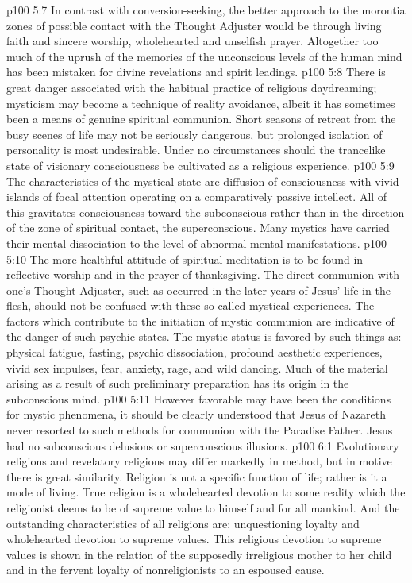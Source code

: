 \vs p100 5:7 \pc In contrast with conversion\hyp{}seeking, the better approach to the morontia zones of possible contact with the Thought Adjuster would be through living faith and sincere worship, wholehearted and unselfish prayer. Altogether too much of the uprush of the memories of the unconscious levels of the human mind has been mistaken for divine revelations and spirit leadings.
\vs p100 5:8 There is great danger associated with the habitual practice of religious daydreaming; mysticism may become a technique of reality avoidance, albeit it has sometimes been a means of genuine spiritual communion. Short seasons of retreat from the busy scenes of life may not be seriously dangerous, but prolonged isolation of personality is most undesirable. Under no circumstances should the trancelike state of visionary consciousness be cultivated as a religious experience.
\vs p100 5:9 The characteristics of the mystical state are diffusion of consciousness with vivid islands of focal attention operating on a comparatively passive intellect. All of this gravitates consciousness toward the subconscious rather than in the direction of the zone of spiritual contact, the superconscious. Many mystics have carried their mental dissociation to the level of abnormal mental manifestations.
\vs p100 5:10 The more healthful attitude of spiritual meditation is to be found in reflective worship and in the prayer of thanksgiving. The direct communion with one’s Thought Adjuster, such as occurred in the later years of Jesus’ life in the flesh, should not be confused with these so\hyp{}called mystical experiences. The factors which contribute to the initiation of mystic communion are indicative of the danger of such psychic states. The mystic status is favored by such things as: physical fatigue, fasting, psychic dissociation, profound aesthetic experiences, vivid sex impulses, fear, anxiety, rage, and wild dancing. Much of the material arising as a result of such preliminary preparation has its origin in the subconscious mind.
\vs p100 5:11 However favorable may have been the conditions for mystic phenomena, it should be clearly understood that Jesus of Nazareth never resorted to such methods for communion with the Paradise Father. Jesus had no subconscious delusions or superconscious illusions.
\vs p100 6:1 Evolutionary religions and revelatory religions may differ markedly in method, but in motive there is great similarity. Religion is not a specific function of life; rather is it a mode of living. True religion is a wholehearted devotion to some reality which the religionist deems to be of supreme value to himself and for all mankind. And the outstanding characteristics of all religions are: unquestioning loyalty and wholehearted devotion to supreme values. This religious devotion to supreme values is shown in the relation of the supposedly irreligious mother to her child and in the fervent loyalty of nonreligionists to an espoused cause.
